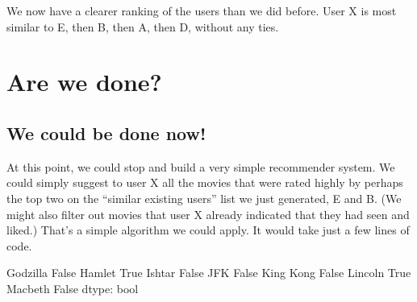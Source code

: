 \documentclass[letterpaper,10pt,english]{jupyterBook}
\begin{document}
\sphinxAtStartPar
We now have a clearer ranking of the users than we did before.  User X is most similar to E, then B, then A, then D, without any ties.


\section{Are we done?}
\label{\detokenize{chapter-16-matrices:are-we-done}}

\subsection{We could be done now!}
\label{\detokenize{chapter-16-matrices:we-could-be-done-now}}
\sphinxAtStartPar
At this point, we could stop and build a very simple recommender system.  We could simply suggest to user X all the movies that were rated highly by perhaps the top two on the “similar existing users” list we just generated, E and B.  (We might also filter out movies that user X already indicated that they had seen and liked.)  That’s a simple algorithm we could apply.  It would take just a few lines of code.

\begin{sphinxVerbatim}[commandchars=\\\{\}]
  \PYG{p}{[}\PYG{p}{]}    
  \PYG{p}{[}\PYG{p}{]}    
                     
        
\end{sphinxVerbatim}

\begin{sphinxVerbatim}[commandchars=\\\{\}]
Godzilla     False
Hamlet        True
Ishtar       False
JFK          False
King Kong    False
Lincoln       True
Macbeth      False
dtype: bool
\end{sphinxVerbatim}
\end{document}
